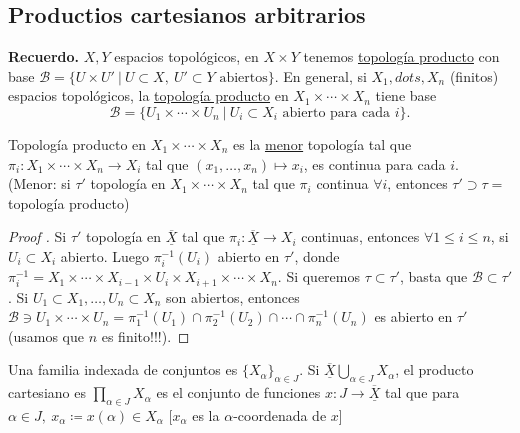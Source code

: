 \documentclass[a4paper]{report}
\begin{document}
\subsection{Productios cartesianos arbitrarios}

\noindent \textbf{Recuerdo.} $X,Y$ espacios topológicos, en $X\times Y$ tenemos \underline{topología producto} con base $\mathcal{B} = \{ U\times U' \ | \ U \subset X,\ U'\subset Y \text{ abiertos} \}$. En general, si $X_1,dots,X_n$ (finitos) espacios topológicos, la \underline{topología producto} en $X_1\times \cdots \times X_n$ tiene base
\[ \mathcal{B} = \{ U_1 \times \cdots \times U_n \ | \ U_i \subset X_i \text{ abierto para cada } i \}. \]

\begin{lemma}
	Topología producto en $X_1 \times \cdots \times X_n$ es la \underline{menor} topología tal que $\pi_i :X_1 \times \cdots \times X_n \to X_i$ tal que $(x_1,\dots,x_n) \mapsto x_i$, es continua para cada $i$. \\
	(Menor: si $\tau'$ topología en $X_1\times\cdots\times X_n$ tal que $\pi_i$ continua $\forall i$, entonces $\tau' \supset \tau=$topología producto)
\end{lemma}
\begin{proof}[Proof ]
	Si $\tau'$ topología en $\underline{\overline{X}}$ tal que $\pi_i : \underline{\overline{X}} \to X_i$ continuas, entonces $\forall 1 \leq i \leq n$, si $U_i \subset X_i$ abierto. Luego $\pi_i^{-1}(U_i)$ abierto en $\tau'$, donde $\pi_i^{-1} = X_1 \times \cdots \times X_{i-1} \times U_i \times X_{i+1} \times \cdots \times X_n$. Si queremos $\tau \subset \tau'$, basta que $\mathcal{B} \subset \tau'$. Si $U_1 \subset X_1, \dots, U_n\subset X_n$ son abiertos, entonces $\mathcal{B} \ni U_1 \times \cdots \times U_n = \pi_{1}^{-1}(U_1) \cap \pi_{2}^{-1}(U_2) \cap \cdots \cap \pi_{n}^{-1}(U_n)$ es abierto en $\tau'$ (usamos que $n$ es finito!!!).
\end{proof}

\begin{definition}[producto]
	Una familia indexada de conjuntos es $\{ X_{\alpha} \}_{\alpha\in J}$. Si $\underline{\overline{X}} \bigcup_{\alpha\in J} X_{\alpha}$, el producto cartesiano es $\prod_{\alpha\in J} X_{\alpha}$ es el conjunto de funciones $x : J \to \underline{\overline{X}}$ tal que para $\alpha \in J,\ x_{\alpha} \coloneq x(\alpha) \in X_{\alpha}$ [$x_{\alpha}$ es la $\alpha$-coordenada de $x$]
\end{definition}
\end{document}
